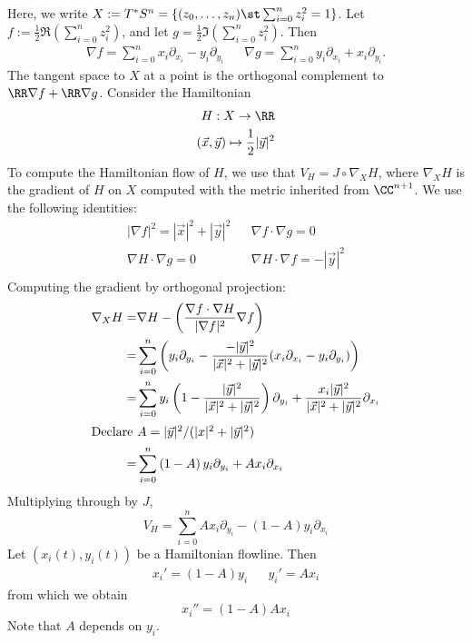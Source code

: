 
 

 Here, we write $X:=T^*S^n=\{(z_0, \ldots, z_n)\st \sum_{i=0}^n z_i^2=1\}$. Let $f:= \frac{1}{2}\Re\left(\sum_{i=0}^n z_i^2\right)$, and let $g=\frac{1}{2}\Im\left(\sum_{i=0}^n z_i^2\right)$. Then 
 \begin{align*}
    \nabla f = \sum_{i=0}^n x_i \partial_{x_i}- y_i \partial_{y_i} && \nabla g = \sum_{i=0}^n y_i \partial_{x_i} + x_i \partial_{y_i}.
 \end{align*}
The tangent space to $X$ at a point is the orthogonal complement to $\RR \nabla f + \RR \nabla g$. Consider the Hamiltonian 
\begin{align*}
    H: X\to \RR\\
    (\vec x, \vec y )\mapsto \frac{1}{2}|\vec y|^2
\end{align*}
To compute the Hamiltonian flow of $H$, we use that  $V_H=J\circ  \nabla_{X} H$, where $\nabla_X H$ is the gradient of $H$ on $X$ computed with the metric inherited from $\CC^{n+1}$.  We use the following identities:
\begin{align*}
    |\nabla f |^2 = |\vec x|^2+|\vec y|^2 &&  \nabla f \cdot    \nabla g = 0 \\
    \nabla H \cdot \nabla g = 0 && \nabla H \cdot \nabla f = -|\vec y |^2\\
\end{align*}
Computing the gradient by orthogonal projection:
\begin{align*}
    \nabla_X H =& \nabla H - \left(\frac{\nabla f \cdot \nabla H}{|\nabla f|^2}\nabla f \right)\\
    =& \sum_{i=0}^n\left(y_i \partial_{y_i}- \frac{-|\vec y|^2}{|\vec x|^2+ |\vec y|^2}( x_i \partial_{x_i}- y_i \partial_{y_i})\right) \\
    =& \sum_{i=0}^n y_i\left(1- \frac{|\vec y|^2}{|\vec x|^2 +|\vec y|^2}\right) \partial_{y_i}+ \frac{x_i|\vec y|^2}{|\vec x|^2 +|\vec y|^2}\partial_{x_i}\\
    \intertext{Declare $A= |\vec y|^2/(|x|^2+|\vec y|^2)$}
    =& \sum_{i=0}^n \left(1- A\right)y_i\partial_{y_i}+ Ax_i\partial_{x_i}
\end{align*}
Multiplying through by $J$,
\[V_H= \sum_{i=0}^n Ax_i \partial_{y_i} - (1-A)y_i \partial_{x_i}\]
Let $(x_i(t), y_i(t))$ be a Hamiltonian flowline. Then 
\begin{align*}
    x_i'=(1-A) y_i && y_i'=A x_i
\end{align*}
from which we obtain 
\[x_i''=(1-A) A x_i\]
Note that $A$ depends on $y_i$.

